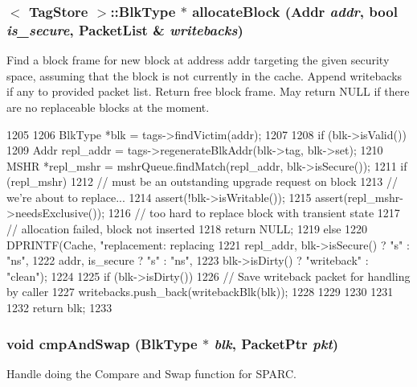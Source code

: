 \hypertarget{classCache_a3da8f395921d5519e28d1c60961ae6c5}{
\subsubsection[{allocateBlock}]{$<$ TagStore $>$::{\bf BlkType} $\ast$ allocateBlock ({\bf Addr} {\em addr}, \/  bool {\em is\_\-secure}, \/  {\bf PacketList} \& {\em writebacks})}}
\label{classCache_a3da8f395921d5519e28d1c60961ae6c5}
Find a block frame for new block at address addr targeting the given security space, assuming that the block is not currently in the cache. Append writebacks if any to provided packet list. Return free block frame. May return NULL if there are no replaceable blocks at the moment. 


\begin{DoxyCode}
1205 {
1206     BlkType *blk = tags->findVictim(addr);
1207 
1208     if (blk->isValid()) {
1209         Addr repl_addr = tags->regenerateBlkAddr(blk->tag, blk->set);
1210         MSHR *repl_mshr = mshrQueue.findMatch(repl_addr, blk->isSecure());
1211         if (repl_mshr) {
1212             // must be an outstanding upgrade request on block
1213             // we're about to replace...
1214             assert(!blk->isWritable());
1215             assert(repl_mshr->needsExclusive());
1216             // too hard to replace block with transient state
1217             // allocation failed, block not inserted
1218             return NULL;
1219         } else {
1220             DPRINTF(Cache, "replacement: replacing %
1221                     repl_addr, blk->isSecure() ? "s" : "ns",
1222                     addr, is_secure ? "s" : "ns",
1223                     blk->isDirty() ? "writeback" : "clean");
1224 
1225             if (blk->isDirty()) {
1226                 // Save writeback packet for handling by caller
1227                 writebacks.push_back(writebackBlk(blk));
1228             }
1229         }
1230     }
1231 
1232     return blk;
1233 }
\end{DoxyCode}
\hypertarget{classCache_a911af8215907296fb2453c696cb89a02}{
\subsubsection[{cmpAndSwap}]{\setlength{\rightskip}{0pt plus 5cm}void cmpAndSwap ({\bf BlkType} $\ast$ {\em blk}, \/  {\bf PacketPtr} {\em pkt})}}
\label{classCache_a911af8215907296fb2453c696cb89a02}
Handle doing the Compare and Swap function for SPARC. 


